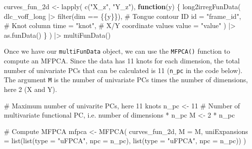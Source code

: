 \documentclass[
  man,
  longtable,
  nolmodern,
  notxfonts,
  notimes,
  colorlinks=true,linkcolor=blue,citecolor=blue,urlcolor=blue]{apa7}
\newenvironment{Shaded}{\begin{snugshade}}{\end{snugshade}}
\newcommand{\AttributeTok}[1]{\textcolor[rgb]{0.40,0.45,0.13}{#1}}
\newcommand{\CommentTok}[1]{\textcolor[rgb]{0.37,0.37,0.37}{#1}}
\newcommand{\ControlFlowTok}[1]{\textcolor[rgb]{0.00,0.23,0.31}{\textbf{#1}}}
\newcommand{\DecValTok}[1]{\textcolor[rgb]{0.68,0.00,0.00}{#1}}
\newcommand{\FunctionTok}[1]{\textcolor[rgb]{0.28,0.35,0.67}{#1}}
\newcommand{\NormalTok}[1]{\textcolor[rgb]{0.00,0.23,0.31}{#1}}
\newcommand{\OtherTok}[1]{\textcolor[rgb]{0.00,0.23,0.31}{#1}}
\newcommand{\SpecialCharTok}[1]{\textcolor[rgb]{0.37,0.37,0.37}{#1}}
\newcommand{\StringTok}[1]{\textcolor[rgb]{0.13,0.47,0.30}{#1}}
\begin{document}
\begin{Shaded}
\begin{Highlighting}[]
\NormalTok{curves\_fun\_2d }\OtherTok{\textless{}{-}} \FunctionTok{lapply}\NormalTok{(}
  \FunctionTok{c}\NormalTok{(}\StringTok{"X\_z"}\NormalTok{, }\StringTok{"Y\_z"}\NormalTok{),}
  \ControlFlowTok{function}\NormalTok{(y) \{}
    \FunctionTok{long2irregFunData}\NormalTok{(}
\NormalTok{      dlc\_voff\_long }\SpecialCharTok{|\textgreater{}} \FunctionTok{filter}\NormalTok{(dim }\SpecialCharTok{==}\NormalTok{ \{\{y\}\}),}
      \CommentTok{\# Tongue contour ID}
      \AttributeTok{id =} \StringTok{"frame\_id"}\NormalTok{,}
      \CommentTok{\# Knot column}
      \AttributeTok{time =} \StringTok{"knot"}\NormalTok{,}
      \CommentTok{\# X/Y coordinate values}
      \AttributeTok{value =} \StringTok{"value"}
\NormalTok{    ) }\SpecialCharTok{|\textgreater{}} 
    \FunctionTok{as.funData}\NormalTok{()}
\NormalTok{  \}}
\NormalTok{) }\SpecialCharTok{|\textgreater{}} 
  \FunctionTok{multiFunData}\NormalTok{()}
\end{Highlighting}
\end{Shaded}

Once we have our \texttt{multiFunData} object, we can use the
\texttt{MFPCA()} function to compute an MFPCA. Since the data has 11
knots for each dimension, the total number of univariate PCs that can be
calculated is 11 (\texttt{n\_pc} in the code below). The argument
\texttt{M} is the number of univariate PCs times the number of
dimensions, here 2 (X and Y).

\begin{Shaded}
\begin{Highlighting}[]
\CommentTok{\# Maximum number of univarite PCs, here 11 knots}
\NormalTok{n\_pc }\OtherTok{\textless{}{-}} \DecValTok{11}
\CommentTok{\# Number of multivariate functional PC, i.e. number of dimensions * n\_pc}
\NormalTok{M }\OtherTok{\textless{}{-}} \DecValTok{2} \SpecialCharTok{*}\NormalTok{ n\_pc}

\CommentTok{\# Compute MFPCA}
\NormalTok{mfpca }\OtherTok{\textless{}{-}} \FunctionTok{MFPCA}\NormalTok{(}
\NormalTok{  curves\_fun\_2d,}
  \AttributeTok{M =}\NormalTok{ M,}
  \AttributeTok{uniExpansions =} \FunctionTok{list}\NormalTok{(}\FunctionTok{list}\NormalTok{(}\AttributeTok{type =} \StringTok{"uFPCA"}\NormalTok{, }\AttributeTok{npc =}\NormalTok{ n\_pc), }\FunctionTok{list}\NormalTok{(}\AttributeTok{type =} \StringTok{"uFPCA"}\NormalTok{, }\AttributeTok{npc =}\NormalTok{ n\_pc))}
\NormalTok{)}
\end{Highlighting}
\end{Shaded}
\end{document}
